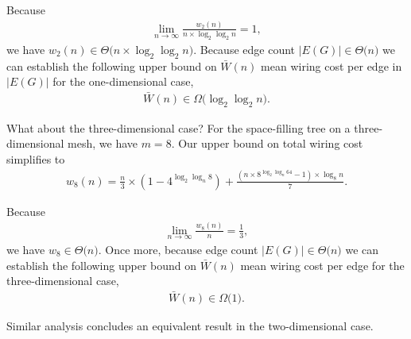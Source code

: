 Because
\begin{align*}
\lim_{n \rightarrow \infty}
\frac{
  w_2(n)
}{
  n \times \log_2 \log_2 n
}
= 1,
\end{align*}
we have $w_2(n) \in \Theta \Big( n \times \log_2 \log_2 n \Big)$.
Because edge count $|E(G)| \in \Theta \Big( n \Big)$ we can establish the following upper bound on $\bar{W}(n)$ mean wiring cost per edge in $|E(G)|$ for the one-dimensional case,
\begin{align*}
\bar{W}(n) \in \Omega\Big( \log_2 \log_2 n \Big).
\end{align*}

What about the three-dimensional case?
For the space-filling tree on a three-dimensional mesh, we have $m = 8$.
Our upper bound on total wiring cost simplifies to
\begin{align*}
w_8(n) =
\frac{n}{3}
\times (1 - 4^{ \log_2 \log_n 8 })
+
\frac{
  (
    n \times 8^{
      \log_2 \log_n 64
    } - 1
  ) \times \log_8 n
}{7}.
\end{align*}

Because
\begin{align*}
\lim_{n \rightarrow \infty}
\frac{
  w_8(n)
}{
  n
}
= \frac{1}{3},
\end{align*}
we have $w_8 \in \Theta \Big( n \Big)$.
Once more, because edge count $|E(G)| \in \Theta \Big( n \Big)$ we can establish the following upper bound on $\bar{W}(n)$ mean wiring cost per edge for the three-dimensional case,
\begin{align*}
\bar{W}(n) \in \Omega \Big( 1 \Big).
\end{align*}

%

Similar analysis concludes an equivalent result in the two-dimensional case.

%
%
